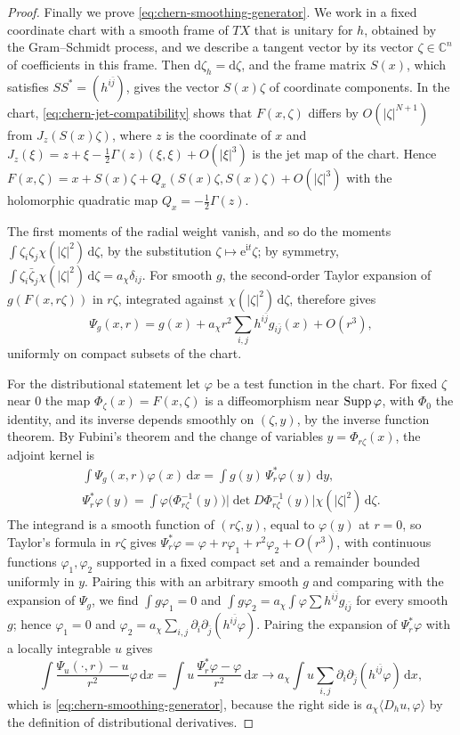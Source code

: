 \begin{proof}
Finally we prove \eqref{eq:chern-smoothing-generator}. We work in a fixed coordinate chart with a smooth frame of $T X$ that is unitary for $h$, obtained by the Gram--Schmidt process, and we describe a tangent vector by its vector $\zeta\in\mathbb C^n$ of coefficients in this frame. Then $\mathrm d\zeta_h=\mathrm d\zeta$, and the frame matrix $S(x)$, which satisfies $SS^*=(h^{i\bar j})$, gives the vector $S(x)\zeta$ of coordinate components. In the chart, \eqref{eq:chern-jet-compatibility} shows that $F(x,\zeta)$ differs by $O(|\zeta|^{N+1})$ from $J_z(S(x)\zeta)$, where $z$ is the coordinate of $x$ and $J_z(\xi)=z+\xi-\frac12\Gamma(z)(\xi,\xi)+O(|\xi|^3)$ is the jet map of the chart. Hence $F(x,\zeta)=x+S(x)\zeta+Q_x(S(x)\zeta,S(x)\zeta)+O(|\zeta|^3)$ with the holomorphic quadratic map $Q_x=-\frac12\Gamma(z)$.

The first moments of the radial weight vanish, and so do the moments $\int\zeta_i\zeta_j\chi(|\zeta|^2)\,\mathrm d\zeta$, by the substitution $\zeta\mapsto\mathrm e^{\mathrm it}\zeta$; by symmetry, $\int\zeta_i\bar\zeta_j\chi(|\zeta|^2)\,\mathrm d\zeta=a_\chi\delta_{ij}$. For smooth $g$, the second-order Taylor expansion of $g(F(x,r\zeta))$ in $r\zeta$, integrated against $\chi(|\zeta|^2)\,\mathrm d\zeta$, therefore gives
\[
 \Psi_g(x,r)=g(x)+a_\chi r^2\sum_{i,j}h^{i\bar j}g_{i\bar j}(x)+O(r^3),
\]
uniformly on compact subsets of the chart.

For the distributional statement let $\varphi$ be a test function in the chart. For fixed $\zeta$ near $0$ the map $\Phi_\zeta(x)=F(x,\zeta)$ is a diffeomorphism near $\operatorname{Supp}\varphi$, with $\Phi_0$ the identity, and its inverse depends smoothly on $(\zeta,y)$, by the inverse function theorem. By Fubini's theorem and the change of variables $y=\Phi_{r\zeta}(x)$, the adjoint kernel is
\begin{gather*}
 \int\Psi_g(x,r)\varphi(x)\,\mathrm dx=\int g(y)\,\Psi_r^*\varphi(y)\,\mathrm dy,\\
 \Psi_r^*\varphi(y)=\int\varphi\bigl(\Phi_{r\zeta}^{-1}(y)\bigr)\bigl|\det D\Phi_{r\zeta}^{-1}(y)\bigr|\chi(|\zeta|^2)\,\mathrm d\zeta.
\end{gather*}
The integrand is a smooth function of $(r\zeta,y)$, equal to $\varphi(y)$ at $r=0$, so Taylor's formula in $r\zeta$ gives $\Psi_r^*\varphi=\varphi+r\varphi_1+r^2\varphi_2+O(r^3)$, with continuous functions $\varphi_1,\varphi_2$ supported in a fixed compact set and a remainder bounded uniformly in $y$. Pairing this with an arbitrary smooth $g$ and comparing with the expansion of $\Psi_g$, we find $\int g\varphi_1=0$ and $\int g\varphi_2=a_\chi\int\varphi\sum h^{i\bar j}g_{i\bar j}$ for every smooth $g$; hence $\varphi_1=0$ and $\varphi_2=a_\chi\sum_{i,j}\partial_i\partial_{\bar j}(h^{i\bar j}\varphi)$. Pairing the expansion of $\Psi_r^*\varphi$ with a locally integrable $u$ gives
\[
 \int\frac{\Psi_u(\cdot,r)-u}{r^2}\varphi\,\mathrm dx=\int u\,\frac{\Psi_r^*\varphi-\varphi}{r^2}\,\mathrm dx\longrightarrow a_\chi\int u\sum_{i,j}\partial_i\partial_{\bar j}(h^{i\bar j}\varphi)\,\mathrm dx,
\]
which is \eqref{eq:chern-smoothing-generator}, because the right side is $a_\chi\langle D_hu,\varphi\rangle$ by the definition of distributional derivatives.
\end{proof}
